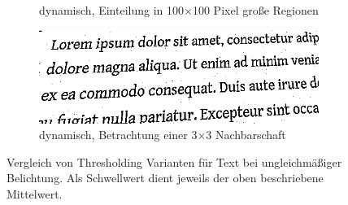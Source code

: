 \begin{figure}[H]
\begin{subfigure}{0.49\linewidth}
    \caption{dynamisch, Einteilung in 100$\times$100 Pixel große Regionen}
  \end{subfigure}
  \begin{subfigure}{0.49\linewidth}
    \centering
    \includegraphics[width=\linewidth]{img/basics/segmentation/dynamic}
    \caption{dynamisch, Betrachtung einer 3$\times$3 Nachbarschaft}
  \end{subfigure}
  \caption[Vergleich von Thresholding Varianten]{Vergleich von Thresholding Varianten für Text bei ungleichmäßiger Belichtung. Als Schwellwert dient jeweils der oben beschriebene Mittelwert.}
\end{figure}
